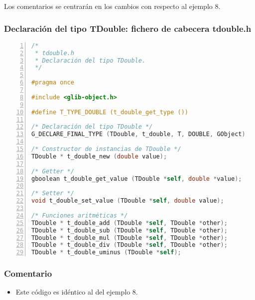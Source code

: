 Los comentarios se centrarán en los cambios con respecto al ejemplo 8.


\subsubsection{Declaración del tipo \textsf{TDouble}: fichero de cabecera \textsf{tdouble.h}}

\begin{lstlisting}[language=C, numbers=left]
/*
 * tdouble.h
 * Declaración del tipo TDouble.
 */

#pragma once

#include <glib-object.h>

#define T_TYPE_DOUBLE (t_double_get_type ())

/* Declaración del tipo TDouble */
G_DECLARE_FINAL_TYPE (TDouble, t_double, T, DOUBLE, GObject)

/* Constructor de instancias de TDouble */
TDouble * t_double_new (double value);

/* Getter */
gboolean t_double_get_value (TDouble *self, double *value);

/* Setter */
void t_double_set_value (TDouble *self, double value);
  
/* Funciones aritméticas */
TDouble * t_double_add (TDouble *self, TDouble *other);
TDouble * t_double_sub (TDouble *self, TDouble *other);
TDouble * t_double_mul (TDouble *self, TDouble *other);
TDouble * t_double_div (TDouble *self, TDouble *other);
TDouble * t_double_uminus (TDouble *self);
\end{lstlisting}

\subsubsection{Comentario}
\begin{itemize}
\item Este código es idéntico al del ejemplo 8.
\end{itemize}


